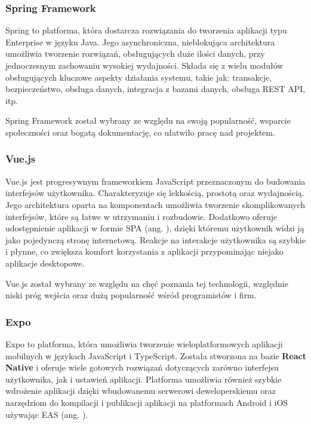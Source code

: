 \subsubsection*{Spring Framework}

Spring to platforma, która dostarcza rozwiązania do tworzenia aplikacji typu Enterprise w języku Java.
Jego asynchroniczna, nieblokująca architektura umożliwia tworzenie rozwiązań, obsługujących duże ilości danych, przy jednoczesnym zachowaniu wysokiej wydajności.
Składa się z wielu modułów obsługujących kluczowe aspekty działania systemu, takie jak: transakcje, bezpieczeństwo, obsługa danych, integracja z bazami danych, obsługa REST API, itp. \cite{bib:spring}

Spring Framework został wybrany ze względu na swoją popularność, wsparcie społeczności oraz bogatą dokumentację, co ułatwiło pracę nad projektem.

\subsubsection*{Vue.js}

Vue.js jest progresywnym frameworkiem JavaScript przeznaczonym do budowania interfejsów użytkownika. Charakteryzuje się lekkością, prostotą oraz wydajnością. Jego architektura oparta na komponentach umożliwia tworzenie skomplikowanych interfejsów, które są łatwe w utrzymaniu i rozbudowie. Dodatkowo oferuje udostępnienie aplikacji w formie SPA (ang. ), dzięki któremu użytkownik widzi ją jako pojedynczą stronę internetową. Reakcje na interakcje użytkownika są szybkie i płynne, co zwiększa komfort korzystania z aplikacji przypominając niejako aplikacje desktopowe. \cite{bib:vuejs}

Vue.js został wybrany ze względu na chęć poznania tej technologii, względnie niski próg wejścia oraz dużą popularność wśród programistów i firm.

\subsubsection*{Expo}

Expo to platforma, która umożliwia tworzenie wieloplatformowych aplikacji mobilnych w językach JavaScript i TypeScript. Została stworzona na bazie {\bfseries React Native} i oferuje wiele gotowych rozwiązań dotyczących zarówno interfejsu użytkownika, jak i ustawień aplikacji. Platforma umożliwia również szybkie wdrożenie aplikacji dzięki wbudowanemu serwerowi deweloperskiemu oraz narzędziom do kompilacji i publikacji aplikacji na platformach Android i iOS używając EAS (ang. ). \cite{bib:expo}

